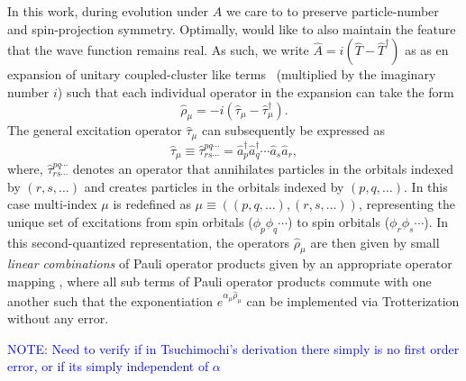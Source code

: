 \documentclass[aip,jcp,amsmath,amssymb, reprint]{revtex4-1}
\newcommand{\cop}[1]{\hat{a}^{\dagger}_{#1}}
\newcommand{\aop}[1]{\hat{a}_{#1}}
\begin{document}
In this work, during evolution under $\hat{A}$ we care to to preserve particle-number and spin-projection symmetry.
Optimally, would like to also maintain the feature that the wave function remains real.
As such, we write $\hat{A} = i(\hat{T} - \hat{T}^\dagger)$ as as en expansion of unitary coupled-cluster like terms~\cite{} (multiplied by the imaginary number $i$) such that each individual operator in the expansion can take the form
\begin{equation}
\hat{\rho}_\mu = -i(\hat{\tau}_\mu - \hat{\tau}_\mu^\dagger).
\end{equation} 
The general excitation operator $\hat{\tau}_\mu$ can subsequently be expressed as
$$
\hat{\tau}_\mu \equiv \hat{\tau}_{rs\cdots}^{pq\cdots} = \cop{p} \cop{q} \cdots \aop{s} \aop{r},
$$
where, $\hat{\tau}_{rs\cdots}^{pq\cdots}$ denotes an operator that annihilates particles in the orbitals indexed by $(r,s,\ldots)$ and creates particles in the  orbitals indexed by $(p,q,\ldots)$. 
In this case multi-index $\mu$ is redefined as $\mu \equiv ((p,q,\ldots),(r,s,\ldots))$, representing the unique set of excitations from spin orbitals ($\phi_p \phi_q \cdots$) to spin orbitals ($\phi_r \phi_s \cdots$).
In this second-quantized representation, the operators $\hat{\rho}_\mu$ are then given by small \textit{linear combinations} of Pauli operator products given by an appropriate operator mapping \cite{}, where all sub terms of Pauli operator products commute with one another \cite{} such that the exponentiation $e^{\alpha_\mu \hat{\rho}_\mu}$ can be implemented via Trotterization without any error. 


\textcolor{blue}{NOTE: Need to verify if in Tsuchimochi's derivation there simply is no first order error, or if its simply independent of $\alpha$}
\end{document}
